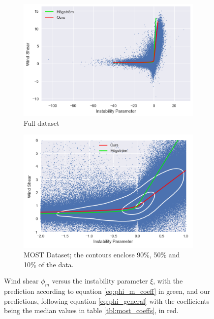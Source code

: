 \documentclass[a4paper,11pt]{kth-mag}
\begin{document}
\begin{figure}
    \centering
    \begin{subfigure}[t]{0.49\textwidth}
        \centering
        \includegraphics[width=\textwidth]{images/most_full}
        \caption{Full dataset}
        \label{fig:most_full}
    \end{subfigure}
    \hfill
    \begin{subfigure}[t]{0.49\textwidth}
        \centering
        \includegraphics[width=\textwidth]{images/most_zoom}
        \caption{MOST Dataset; the contours enclose 90\%, 50\% and 10\% of the data.}
        \label{fig:most_zoom}
    \end{subfigure}
    \caption{Wind shear $\phi_m$ versus the instability parameter $\xi$, with the prediction according to equation \ref{eq:phi_m_coeff} in green, and our predictions, following equation \ref{eq:phi_general} with the coefficients being the median values in table \ref{tbl:most_coeffs}, in red.}
	\label{fig:most_scatter}
\end{figure}
\end{document}
